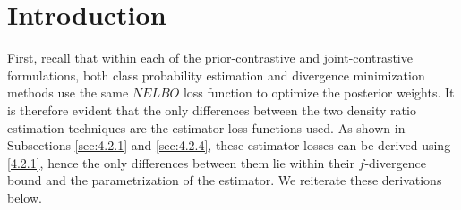 \documentclass[honours,12pt, twoside]{unswthesis}
\numberwithin{equation}{section}
\theoremstyle{definition}
\begin{document}
\section{Introduction}\label{sec:5.1}
First, recall that within each of the prior-contrastive and joint-contrastive formulations, both class probability estimation and divergence minimization methods use the same $NELBO$ loss function to optimize the posterior weights. It is therefore evident that the only differences between the two density ratio estimation techniques are the estimator loss functions used. As shown in Subsections \ref{sec:4.2.1} and \ref{sec:4.2.4}, these estimator losses can be derived using \autoref{4.2.1}, hence the only differences between them lie within their $f$-divergence bound and the parametrization of the estimator. We reiterate these derivations below.
\end{document}
